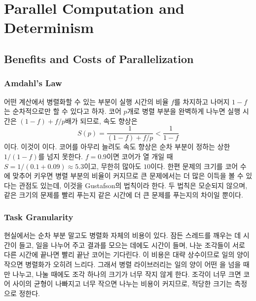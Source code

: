 \chapter{Parallel Computation and Determinism}
\label{ch:parallel}


\section{Benefits and Costs of Parallelization}
\label{sec:parallel-cost}

\subsection{Amdahl's Law}

어떤 계산에서 병렬화할 수 있는 부분이 실행 시간의 비율 $f$를 차지하고 나머지 $1-f$는 순차적으로만 할 수 있다고 하자. 코어 $p$개로 병렬 부분을 완벽하게 나누면 실행 시간은 $(1-f)+f/p$배가 되므로, 속도 향상은
\[
S(p)=\frac1{(1-f)+f/p}<\frac1{1-f}
\]
이다. 이것이 이다\cite{amdahl1967}. 코어를 아무리 늘려도 속도 향상은 순차 부분이 정하는 상한 $1/(1-f)$를 넘지 못한다. $f=0.9$이면 코어가 열 개일 때 $S=1/(0.1+0.09)\approx5.3$이고, 무한히 많아도 $10$이다. 한편 문제의 크기를 코어 수에 맞추어 키우면 병렬 부분의 비율이 커지므로 큰 문제에서는 더 많은 이득을 볼 수 있다는 관점도 있는데, 이것을 Gustafson의 법칙이라 한다\cite{gustafson1988}. 두 법칙은 모순되지 않으며, 같은 크기의 문제를 빨리 푸는지 같은 시간에 더 큰 문제를 푸는지의 차이일 뿐이다.

\subsection{Task Granularity}

현실에서는 순차 부분 말고도 병렬화 자체의 비용이 있다. 잠든 스레드를 깨우는 데 시간이 들고, 일을 나누어 주고 결과를 모으는 데에도 시간이 들며, 나눈 조각들이 서로 다른 시간에 끝나면 빨리 끝난 코어는 기다린다. 이 비용은 대략 상수이므로 일의 양이 작으면 병렬화가 오히려 느리다. 그래서 병렬 라이브러리는 일의 양이 어떤 을 넘을 때만 나누고, 나눌 때에도 조각 하나의 크기가 너무 작지 않게 한다. 조각이 너무 크면 코어 사이의 균형이 나빠지고 너무 작으면 나누는 비용이 커지므로, 적당한 크기는 측정으로 정한다.

